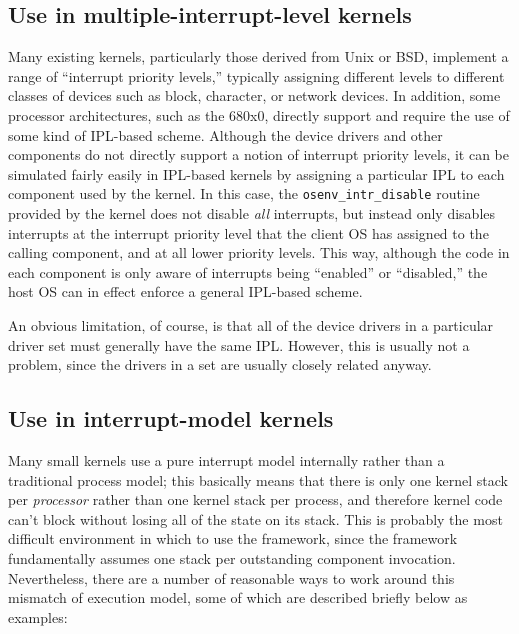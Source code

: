 \subsection{Use in multiple-interrupt-level kernels}

Many existing kernels, particularly those derived from Unix or BSD,
implement a range of ``interrupt priority levels,''
typically assigning different levels to different classes of devices
such as block, character, or network devices.
In addition, some processor architectures, such as the 680x0,
directly support and require the use of some kind of IPL-based scheme.
Although the \oskit{} device drivers and other \oskit{} components
do not directly support a notion of interrupt priority levels,
it can be simulated fairly easily in IPL-based kernels
by assigning a particular IPL to each component used by the kernel.
In this case,
the {\tt osenv_intr_disable} routine provided by the kernel
does not disable \emph{all} interrupts,
but instead only disables interrupts at the interrupt priority level
that the client OS has assigned to the calling component,
and at all lower priority levels.
This way, although the code in each component
is only aware of interrupts being ``enabled'' or ``disabled,''
the host OS can in effect enforce a general IPL-based scheme.

An obvious limitation, of course,
is that all of the device drivers in a particular driver set
must generally have the same IPL\@.
However, this is usually not a problem,
since the drivers in a set are usually closely related anyway.

\subsection{Use in interrupt-model kernels}

Many small kernels use a pure interrupt model internally
rather than a traditional process model;
this basically means that there is only one kernel stack per \emph{processor}
rather than one kernel stack per process,
and therefore kernel code can't block
without losing all of the state on its stack.
This is probably the most difficult environment
in which to use the framework,
since the framework fundamentally assumes
one stack per outstanding component invocation.
Nevertheless, there are a number of reasonable ways
to work around this mismatch of execution model,
some of which are described briefly below as examples:

